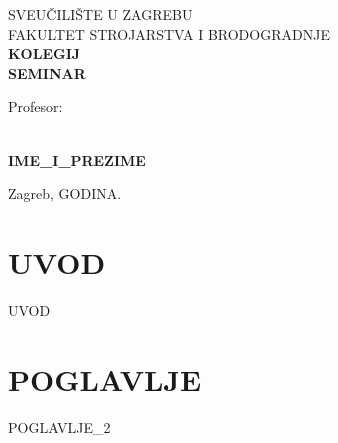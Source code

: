 \documentclass[12pt,a4paper]{article}
\begin{document}
\begin{titlepage}
    \thispagestyle{empty}
    \centering
    {\fontsize{16pt}{19pt}\selectfont SVEUČILIŠTE U ZAGREBU\\}
    {\fontsize{16pt}{19pt}\selectfont FAKULTET STROJARSTVA I BRODOGRADNJE\\}
    \vfill
    {\fontsize{28pt}{34pt}\selectfont\bfseries {{KOLEGIJ}}\\}
    \vspace{0.5cm}
    {\fontsize{28pt}{34pt}\selectfont\bfseries SEMINAR\\}
    \vfill
    \noindent
    \begin{minipage}[t]{0.48\textwidth}
        \raggedright
        {\fontsize{14pt}{17pt}\selectfont Profesor:\\}
        {\fontsize{14pt}{17pt}\\}
    \end{minipage}
    \hfill
    \begin{minipage}[t]{0.48\textwidth}
        \raggedleft
        {\fontsize{14pt}{17pt}\selectfont\bfseries {{IME_I_PREZIME}}\\}
    \end{minipage}
    \vspace{1cm}
    \begin{center}
        {\fontsize{14pt}{17pt}\selectfont Zagreb, {{GODINA}}.}
    \end{center}
\end{titlepage}


\tableofcontents
\newpage
\listoffigures
\newpage
\listoftables
\newpage


\section{UVOD}
{{UVOD}}

\section{POGLAVLJE}
{{POGLAVLJE_2}}
\end{document}
